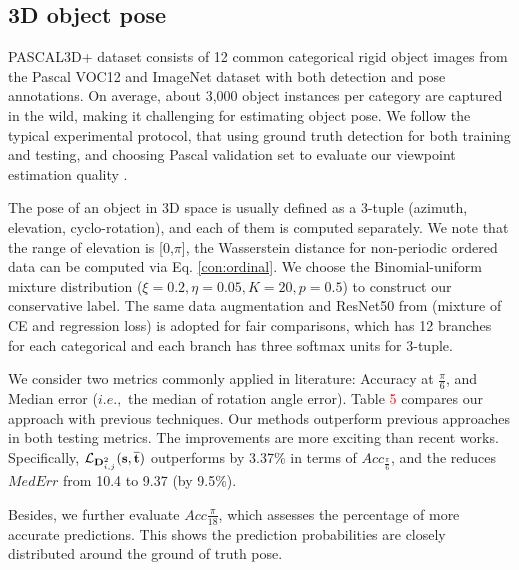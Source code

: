 \subsection{3D object pose} 







PASCAL3D+ dataset \cite{xiang2014beyond} consists of 12 common categorical rigid object images from the Pascal VOC12 and ImageNet dataset \cite{deng2009imagenet} with both detection and pose annotations. On average, about 3,000 object instances per category are captured in the wild, making it challenging for estimating object pose. We follow the typical experimental protocol, that using ground truth detection for both training and testing, and choosing Pascal validation set to evaluate our viewpoint estimation quality \cite{mahendran2018mixed,prokudin2018deep,grabner20183d}.

The pose of an object in 3D space is usually defined as a 3-tuple (azimuth, elevation, cyclo-rotation), and each of them is computed separately. We note that the range of elevation is [0,$\pi$], the Wasserstein distance for non-periodic ordered data can be computed via Eq. \eqref{con:ordinal}. We choose the Binomial-uniform mixture distribution ($\xi=0.2,\eta=0.05,K=20,p=0.5$) to construct our conservative label. The same data augmentation and ResNet50 from \cite{mahendran2018mixed} (mixture of CE and regression loss) is adopted for fair comparisons, which has 12 branches for each categorical and each branch has three softmax units for 3-tuple. 


We consider two metrics commonly applied in literature: Accuracy at $\frac{\pi}{6}$, and Median error ($i.e.,$ the median of rotation angle error). Table \textcolor{red}{5} compares our approach with previous techniques. Our methods outperform previous approaches in both testing metrics. The improvements are more exciting than recent works. Specifically, $\small \mathcal{L}_{{\rm\textbf{D}}_{i,j}^2}{(\rm{{\textbf{s},\overline{\textbf{t}}}})}$ outperforms \cite{mahendran2018mixed} by 3.37\% in terms of $Acc_{\frac{\pi}{6}}$, and the reduces $MedErr$ from 10.4 \cite{zhou2018starmap} to 9.37 (by 9.5\%).  

Besides, we further evaluate $Acc\frac{\pi}{18}$, which assesses the percentage of more accurate predictions. This shows the prediction probabilities are closely distributed around the ground of truth pose.    









